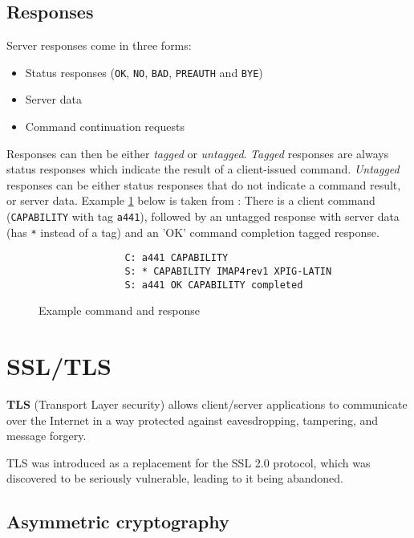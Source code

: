 \documentclass[a4]{report}
\begin{document}
\subsection{Responses}

Server responses come in three forms:

\begin{itemize}
  \item Status responses (\texttt{OK}, \texttt{NO}, \texttt{BAD}, \texttt{PREAUTH} and \texttt{BYE})
  \item Server data
  \item Command continuation requests
\end{itemize}

Responses can then be either \textit{tagged} or \textit{untagged}. \textit{Tagged} responses are always status responses which indicate the result of a client-issued command. \textit{Untagged} responses can be either status responses that do not indicate a command result, or server data. Example \ref{communication} below is taken from \cite{rfc3501}: There is a client command (\texttt{CAPABILITY} with tag \texttt{a441}), followed by an untagged response with server data (has \texttt{*} instead of a tag) and an 'OK' command completion tagged response.

\begin{figure}[h]
  \centering
  \begin{verbatim}
               C: a441 CAPABILITY
               S: * CAPABILITY IMAP4rev1 XPIG-LATIN
               S: a441 OK CAPABILITY completed
  \end{verbatim}
  \caption{Example command and response}
  \label{communication}
\end{figure}

\section{SSL/TLS}

\textbf{TLS} (Transport Layer security) allows client/server applications to communicate over the Internet in a way protected against eavesdropping, tampering, and message forgery\cite{rfc8446}.

TLS was introduced as a replacement for the SSL 2.0 protocol, which was discovered to be seriously vulnerable, leading to it being abandoned\cite{rfc6176}.

\subsection{Asymmetric cryptography}
\end{document}
